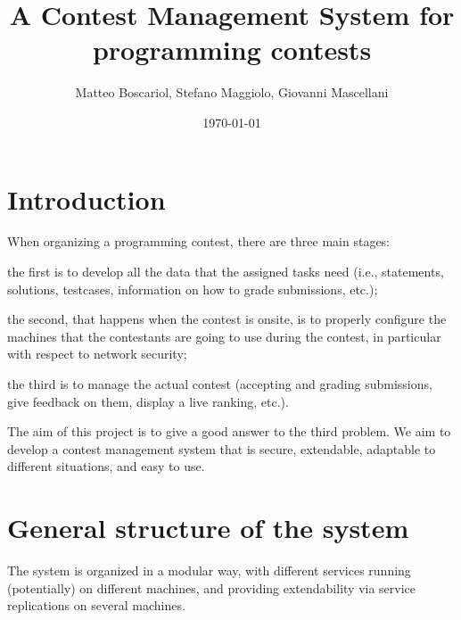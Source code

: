 \documentclass[a4paper,8pt]{amsart}
\title{A Contest Management System for programming contests}
\author{Matteo Boscariol, Stefano Maggiolo, Giovanni Mascellani}
\date{\today}
\newenvironment{squishlist}{%
  \begin{list}{\textbullet}%
    { \setlength{\itemsep}{0pt}%
      \setlength{\parsep}{3pt}%
      \setlength{\topsep}{3pt}%
      \setlength{\partopsep}{0pt}%
      \setlength{\leftmargin}{1.5em}%
      \setlength{\labelwidth}{1em}%
      \setlength{\labelsep}{0.5em} }%
}{\end{list}}
\begin{document}
\maketitle
\tableofcontents

\begin{multicols}{2}

  \section{Introduction}

  When organizing a programming contest, there are three main stages:
  \begin{squishlist}
  \item the first is to develop all the data that the assigned tasks
    need (i.e., statements, solutions, testcases, information on how
    to grade submissions, etc.);
  \item the second, that happens when the contest is onsite, is to
    properly configure the machines that the contestants are going to
    use during the contest, in particular with respect to network
    security;
  \item the third is to manage the actual contest (accepting and
    grading submissions, give feedback on them, display a live
    ranking, etc.).
  \end{squishlist}

  The aim of this project is to give a good answer to the third
  problem. We aim to develop a contest management system that is
  secure, extendable, adaptable to different situations, and easy to
  use.

  \section{General structure of the system}

  The system is organized in a modular way, with different services
  running (potentially) on different machines, and providing
  extendability via service replications on several machines.


\end{multicols}
\end{document}
